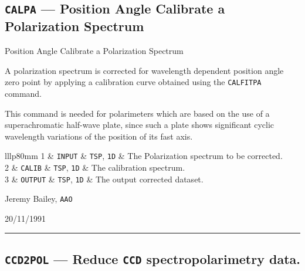 \documentclass[11pt,twoside]{article}
\makeatletter
\renewcommand{\_}{\texttt{\symbol{95}}}
\newcommand{\manrule}{\rule{\textwidth}{0.5mm}}
\newcommand{\manroutine}[3]{\subsection{#1 --- #2}}
\newenvironment{manroutinedescription}{\begin{description}}{\end{description}%
\manrule}
\newcommand{\manroutineitem}[2]{\item[#1:] #2\mbox{}}
\newcommand{\manparametercols}{lllp{80mm}}
\newcommand{\manparameterorder}[3]{#1 & #2 & #3 & }
\newcommand{\manparametertop}{}
\newcommand{\manparameterbottom}{}
\newenvironment{manparametertable}{\gdef\manparameter@ss{}%
\gdef\manparameter@hl{}\hspace*{\fill}\vspace*{-\partopsep}\begin{trivlist}%
\item[]\begin{tabular}{\manparametercols}\manparametertop}{\manparameterbottom%
\end{tabular}\end{trivlist}}
\newcommand{\manparameterentry}[3]{\manparameter@ss\gdef\manparameter@ss{\\}%
\gdef\manparameter@hl{\hline}\manparameterorder{#1}{#2}{#3}}
\newcommand{\mantt}{\tt}
\makeatother
\begin{document}
\manroutine{{\mantt{CALPA}}}{Position Angle Calibrate a Polarization Spectrum}{%
CALPA}
\begin{manroutinedescription}
\manroutineitem{Function}{}
        Position Angle Calibrate a Polarization Spectrum

\manroutineitem{Description}{}
        A polarization spectrum is corrected for wavelength dependent
        position angle zero point by applying a calibration curve obtained
        using the {\mantt{CALFITPA}} command.

        This command is needed for polarimeters which are based on
        the use of a superachromatic half-wave plate, since such a
        plate shows significant cyclic  wavelength variations of the
        position of its fast axis.

\manroutineitem{Parameters}{}
\begin{manparametertable}
\manparameterentry{1}{{\mantt{INPUT}}}{{\mantt{TSP}}, {\mantt{1D}}}  The %
Polarization spectrum to be corrected.
\manparameterentry{2}{{\mantt{CALIB}}}{{\mantt{TSP}}, {\mantt{1D}}}  The %
calibration spectrum.
\manparameterentry{3}{{\mantt{OUTPUT}}}{{\mantt{TSP}}, {\mantt{1D}}}  The %
output corrected dataset.

\end{manparametertable}
\manroutineitem{Support}{}
        Jeremy Bailey, {\mantt{AAO}}

\manroutineitem{Version date}{}
        20/11/1991

\end{manroutinedescription}
\manroutine{{\mantt{CCD2POL}}}{Reduce {\mantt{CCD}} spectropolarimetry data.}{%
CCD2POL}
\end{document}
